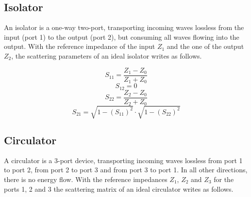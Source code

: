 \documentclass[10pt]{report}
\begin{document}
\subsection{Isolator}

An isolator is a one-way two-port, transporting incoming waves
lossless from the input (port 1) to the output (port 2), but consuming
all waves flowing into the output. With the reference impedance of the
input $Z_1$ and the one of the output $Z_2$, the scattering parameters
of an ideal isolator writes as follows.

\begin{equation}
S_{11} = \frac{Z_1-Z_0}{Z_1+Z_0}
\end{equation}
\begin{equation}
S_{12} = 0
\end{equation}
\begin{equation}
S_{22} = \frac{Z_2-Z_0}{Z_2+Z_0}
\end{equation}
\begin{equation}
S_{21} = \sqrt{1-(S_{11})^2}\cdot\sqrt{1-(S_{22})^2}
\end{equation}

\subsection{Circulator}
\label{sec:CirculatorSparameter}

A circulator is a 3-port device, transporting incoming waves lossless
from port 1 to port 2, from port 2 to port 3 and from port 3 to port
1.  In all other directions, there is no energy flow.  With the
reference impedances $Z_1$, $Z_2$ and $Z_3$ for the ports 1, 2 and 3
the scattering matrix of an ideal circulator writes as follows.
\end{document}
